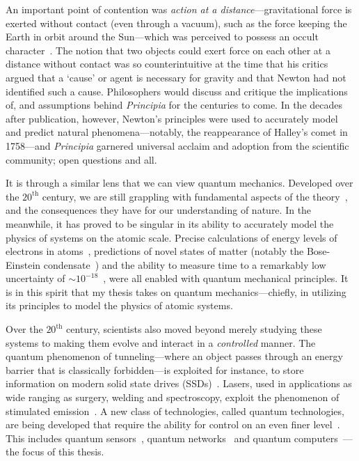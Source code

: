 \documentclass[main.tex]{subfiles}
\begin{document}
An important point of contention was \emph{action at a distance}---gravitational force is exerted without contact (even through a vacuum), such as the force keeping the Earth in orbit around the Sun---which was perceived to possess an occult character~\cite{westfall1983never}. The notion that two objects could exert force on each other at a distance without contact was so counterintuitive at the time that his critics argued that a `cause' or agent is necessary for gravity and that Newton had not identified such a cause. Philosophers would discuss and critique the implications of, and assumptions behind \emph{Principia} for the centuries to come. In the decades after publication, however, Newton's principles were used to accurately model and predict natural phenomena---notably, the reappearance of Halley's comet in 1758---and \emph{Principia} garnered universal acclaim and adoption from the scientific community; open questions and all.

It is through a similar lens that we can view quantum mechanics. Developed over the $20^{\mathrm{th}}$ century, we are still grappling with fundamental aspects of the theory~\cite{hance2022does, bassi2023collapse}, and the consequences they have for our understanding of nature. In the meanwhile, it has proved to be singular in its ability to accurately model the physics of systems on the atomic scale. Precise calculations of energy levels of electrons in atoms~\cite{cowan2023theory}, predictions of novel states of matter (notably the Bose-Einstein condensate~\cite{dalfovo1999theory}) and the ability to measure time to a remarkably low uncertainty of $\sim 10^{-18}$~\cite{RevModPhys.87.637, PhysRevLett.133.023401}, were all enabled with quantum mechanical principles. It is in this spirit that my thesis takes on quantum mechanics---chiefly, in utilizing its principles to model the physics of atomic systems. 

Over the $20^{\mathrm{th}}$ century, scientists also moved beyond merely studying these systems to making them evolve and interact in a \emph{controlled} manner. The quantum phenomenon of tunneling---where an object passes through an energy barrier that is classically forbidden---is exploited for instance, to store information on modern solid state drives (SSDs)~\cite{zuolo2017}. Lasers, used in applications as wide ranging as surgery, welding and spectroscopy, exploit the phenomenon of stimulated emission~\cite{maiman1960, schawlow1958, hooker2010}. A new class of technologies, called quantum technologies, are being developed that require the ability for control on an even finer level~\cite{dowling2003, acin2018, degen2017, azuma2023, shannon2021, altman2021}. This includes quantum sensors~\cite{degen2017}, quantum networks~\cite{kozlowski2019towards} and quantum computers~\cite{ladd2010quantum}---the focus of this thesis.
\end{document}
